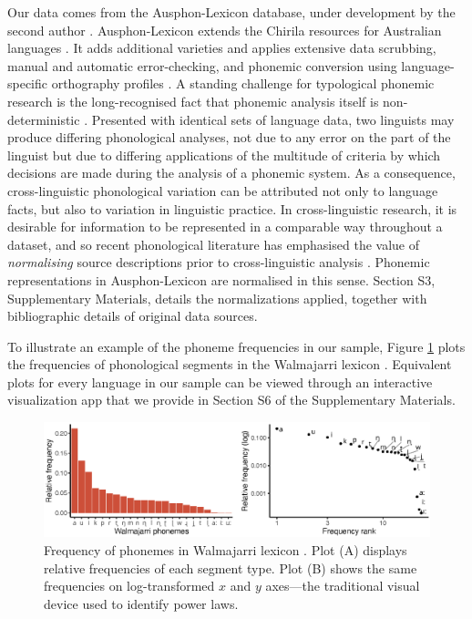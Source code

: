 Our data comes from the Ausphon-Lexicon database, under development by the second author \autocite{round_ausphon-lexicon_2017}. Ausphon-Lexicon extends the Chirila resources for Australian languages \autocite{bowern_chirila:_2016}. It adds additional varieties and applies extensive data scrubbing, manual and automatic error-checking, and phonemic conversion using language-specific orthography profiles \autocite{moran_unicode_2018}. A standing challenge for typological phonemic research is the long-recognised fact that phonemic analysis itself is non-deterministic \autocites{chao_non-uniqueness_1934}{hockett_problem_1963}{hyman_universals_2008}{dresher_contrastive_2009}. Presented with identical sets of language data, two linguists may produce differing phonological analyses, not due to any error on the part of the linguist but due to differing applications of the multitude of criteria by which decisions are made during the analysis of a phonemic system. As a consequence, cross-linguistic phonological variation can be attributed not only to language facts, but also to variation in linguistic practice. In cross-linguistic research, it is desirable for information to be represented in a comparable way throughout a dataset, and so recent phonological literature has emphasised the value of \emph{normalising} source descriptions prior to cross-linguistic analysis \autocites{lass_vowel_1984}{hyman_universals_2008}{van_der_hulst_phonological_2017}{round_matthew_2017}{kiparsky_formal_2018}. Phonemic representations in Ausphon-Lexicon are normalised in this sense. Section S3, Supplementary Materials, details the normalizations applied, together with bibliographic details of original data sources.

To illustrate an example of the phoneme frequencies in our sample, Figure \ref{fig:Figure-1} plots the frequencies of phonological segments in the Walmajarri lexicon \autocite{hudson_walmajarri_1993}. Equivalent plots for every language in our sample can be viewed through an interactive visualization app that we provide in Section S6 of the Supplementary Materials.

\begin{figure}

{\centering \includegraphics[width=180mm]{03-phoneme-frequencies/fig/Fig1_walmajarri} 

}

\caption{Frequency of phonemes in Walmajarri lexicon \autocite{hudson_walmajarri_1993}. Plot (A) displays relative frequencies of each segment type. Plot (B) shows the same frequencies on log-transformed \(x\) and \(y\) axes---the traditional visual device used to identify power laws.}\label{fig:Figure-1}
\end{figure}



